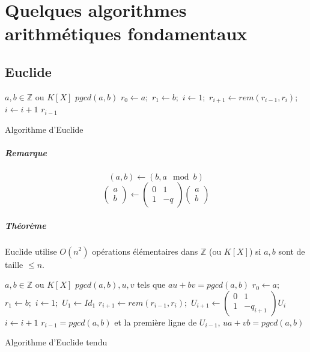 \documentclass[12pt,a4paper]{report}
\begin{document}
\chapter{Quelques algorithmes arithmétiques fondamentaux}
\section{Euclide}
\begin{algorithm}[h!]
\begin{algorithmic}[1]
\REQUIRE $a,b \in \mathbb{Z}$ ou $K[X]$
\ENSURE $pgcd(a,b)$
\STATE $r_0 \leftarrow a;$
\STATE $r_1 \leftarrow b;$
\STATE $i \leftarrow 1;$
\STATE $ r_{i+1} \leftarrow rem(r_{i-1},r_i);$
\STATE $i \leftarrow i+1$
\ENDWHILE
\RETURN $r_{i-1}$
\end{algorithmic}
\caption{Algorithme d'Euclide}
\end{algorithm}
\paragraph{Remarque\\}
$$(a,b) \leftarrow (b,a \mod b)$$
$$ \left(\begin{array}{l}
a \\
b \end{array}\right) 
\leftarrow 
\left(\begin{array}{cc}
0 &1 \\
1 & -q \end{array}\right) 
\left(\begin{array}{l}
a \\
b \end{array}\right) $$
\paragraph{Théorème\\}
Euclide utilise $O(n^2)$ opérations élémentaires dans $\mathbb{Z}$ (ou $K[X]$) si $a,b$ sont de taille $\leqslant n$.
\begin{algorithm}[h!]
\begin{algorithmic}[1]
\REQUIRE $a,b \in \mathbb{Z}$ ou $K[X]$
\ENSURE $pgcd(a,b), u,v$ tels que $au+bv = pgcd(a,b)$
\STATE $r_0 \leftarrow a;$
\STATE $r_1 \leftarrow b;$
\STATE $i \leftarrow 1;$
\STATE $U_1 \leftarrow Id_1$
\STATE $ r_{i+1} \leftarrow rem(r_{i-1},r_i);$
\STATE $U_{i+1} \leftarrow \left(\begin{array}{cc}
0 &1 \\
1 & -q_{i+1} \end{array}\right) U_i$
\STATE $i \leftarrow i+1$
\ENDWHILE
\RETURN $r_{i-1}=pgcd(a,b)$ et la première ligne de $U_{i-1}$, $ua+vb=pgcd(a,b)$
\end{algorithmic}
\caption{Algorithme d'Euclide tendu}
\end{algorithm}
\end{document}
